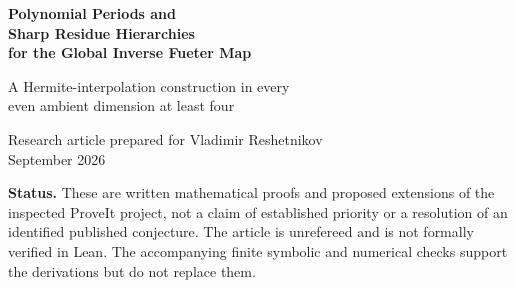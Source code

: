 \documentclass[11pt,a4paper]{article}
\numberwithin{equation}{section}
\theoremstyle{definition}
\theoremstyle{remark}
\begin{document}
\hypersetup{pageanchor=false}
\begin{titlepage}
\vspace*{12mm}
\vspace{13mm}
\begin{flushleft}
{\color{ink}\LARGE\bfseries Polynomial Periods and\\[5pt]
Sharp Residue Hierarchies\\[5pt]
for the Global Inverse Fueter Map}\par
\vspace{8mm}
{\large A Hermite-interpolation construction in every\\
even ambient dimension at least four}\par
\vspace{13mm}
Research article prepared for Vladimir Reshetnikov\\
September 2026
\end{flushleft}
\vspace{8mm}
\begin{abstract}
The quaternionic inverse Fueter problem has a two-period obstruction: a
single-valued slice-regular primitive exists precisely when two target-derived
closed one-forms have zero periods. We construct its higher-dimensional
counterpart. In ambient dimension $2h+2$, one explicit polynomial-valued
closed form of degree $2h-1$ captures all obstructions. Its normalization and
completeness follow from a two-node Hermite-interpolation identity, proved for
arbitrary holomorphic stems by an exact finite-jet argument. Integrating its
coefficients and evaluating the resulting polynomial at the moving point
constructs every global inverse.

The period polynomial gives complete monodromy, an explicit finite-connectivity
cokernel, and the smallest covering on which inversion is possible. Near a
punctured conjugacy sphere it has a finer structure: divisibility by a real
quadratic determines the least possible singularity order among all targets
with that residue. We prove sharp axial-pair growth bounds and sharp physical
$L^2$ energy constants, exhibit logarithmic representatives attaining them,
and classify the residue classes compatible with local $L^p$ integrability
for $p\ge1$. The arguments are self-contained within smooth axial analysis on
product domains disjoint from the real axis.
\end{abstract}
\vfill
\noindent\small\textbf{Status.} These are written mathematical proofs and proposed
extensions of the inspected ProveIt project, not a claim of established priority
or a resolution of an identified published conjecture. The article is unrefereed
and is not formally verified in Lean. The accompanying finite symbolic and
numerical checks support the derivations but do not replace them.
\end{titlepage}
\hypersetup{pageanchor=true}
\end{document}
